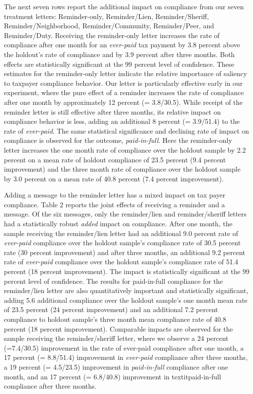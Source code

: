 The next seven rows report the additional impact on compliance from
our seven treatment letters: Reminder-only, Reminder/Lien,
Reminder/Sheriff, Reminder/Neighborhood, Reminder/Community,
Reminder/Peer, and Reminder/Duty.  Receiving the reminder-only letter
increases the rate of compliance after one month for an
\textit{ever-paid} tax payment by 3.8 percent above the holdout's rate
of compliance and by 3.9 percent after three months.  Both effects are
statistically significant at the 99 percent level of confidence.
These estimates for the reminder-only letter indicate the relative
importance of saliency to taxpayer compliance behavior.  Our letter
is particularly effective early in our experiment, where the pure
effect of a reminder increases the rate of compliance after one month
by approximately 12 percent (= 3.8/30.5).  While receipt of the
reminder letter is still effective after three months, its relative
impact on compliance behavior is less, adding an additional 8 percent
(= 3.9/51.4) to the rate of \textit{ever-paid}.  The same statistical
significance and declining rate of impact on compliance is observed
for the outcome, \textit{paid-in-full}.  Here the reminder-only letter
increases the one month rate of compliance over the holdout sample by
2.2 percent on a mean rate of holdout compliance of 23.5 percent (9.4
percent improvement) and the three month rate of compliance over the
holdout sample by 3.0 percent on a mean rate of 40.8 percent (7.4
percent improvement).

Adding a message to the reminder letter has a mixed impact on tax
payer compliance.  Table 2 reports the joint effects of receiving a
reminder and a message.  Of the six messages, only the reminder/lien
and reminder/sheriff letters had a statistically robust \textit{added} impact
on compliance.  After one month, the sample receiving the
reminder/lien letter had an additional 9.0 percent rate of
\textit{ever-paid} compliance over the holdout sample's compliance
rate of 30.5 percent rate (30 percent improvement) and after three
months, an additional 9.2 percent rate of \textit{ever-paid}
compliance over the holdout sample's compliance rate of 51.4 percent
(18 percent improvement).  The impact is statistically significant at
the 99 percent level of confidence.  The results for paid-in-full
compliance for the reminder/lien letter are also quantitatively
important and statistically significant, adding 5.6 additional
compliance over the holdout sample's one month mean rate of 23.5
percent (24 percent improvement) and an additional 7.2 percent
compliance to holdout sample's three month mean compliance rate of
40.8 percent (18 percent improvement).  Comparable impacts are
observed for the sample receiving the reminder/sheriff letter, where
we observe a 24 percent (=7.4/30.5) improvement in the rate of
ever-paid compliance after one month, a 17 percent (= 8.8/51.4)
improvement in \textit{ever-paid} compliance after three months, a 19
percent (= 4.5/23.5) improvement in \textit{paid-in-full} compliance
after one month, and an 17 percent (= 6.8/40.8) improvement in
textit{paid-in-full} compliance after three months.

